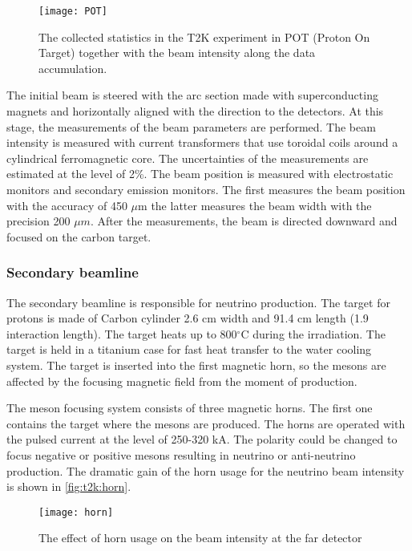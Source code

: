 \documentclass[../main.tex]{subfiles}
\begin{document}
\begin{figure}[!ht]
  \centering
  \texttt{[image: POT]}
  \caption{The collected statistics in the T2K experiment in POT (Proton On Target) together with the beam intensity along the data accumulation.}
  \label{fig:t2k:POT}
\end{figure}

The initial beam is steered with the arc section made with superconducting magnets and horizontally aligned with the direction to the detectors. At this stage, the measurements of the beam parameters are performed. The beam intensity is measured with current transformers that use toroidal coils around a cylindrical ferromagnetic core. The uncertainties of the measurements are estimated at the level of 2\%. The beam position is measured with electrostatic monitors and secondary emission monitors. The first measures the beam position with the accuracy of 450 $\mu \text{m}$ the latter measures the beam width with the precision 200 $\mu m$. After the measurements, the beam is directed downward and focused on the carbon target.

\subsubsection{Secondary beamline}
The secondary beamline is responsible for neutrino production. The target for protons is made of Carbon cylinder 2.6 cm width and 91.4 cm length (1.9 interaction length). The target heats up to 800$^\circ$C during the irradiation. The target is held in a titanium case for fast heat transfer to the water cooling system. The target is inserted into the first magnetic horn, so the mesons are affected by the focusing magnetic field from the moment of production.

The meson focusing system consists of three magnetic horns. The first one contains the target where the mesons are produced. The horns are operated with the pulsed current at the level of 250-320 kA. The polarity could be changed to focus negative or positive mesons resulting in neutrino or anti-neutrino production. The dramatic gain of the horn usage for the neutrino beam intensity is shown in \autoref{fig:t2k:horn}.

\begin{figure}[!ht]
  \centering
    \texttt{[image: horn]}
    \caption{The effect of horn usage on the beam intensity at the far detector}
    \label{fig:t2k:horn}
\end{figure}
\end{document}
